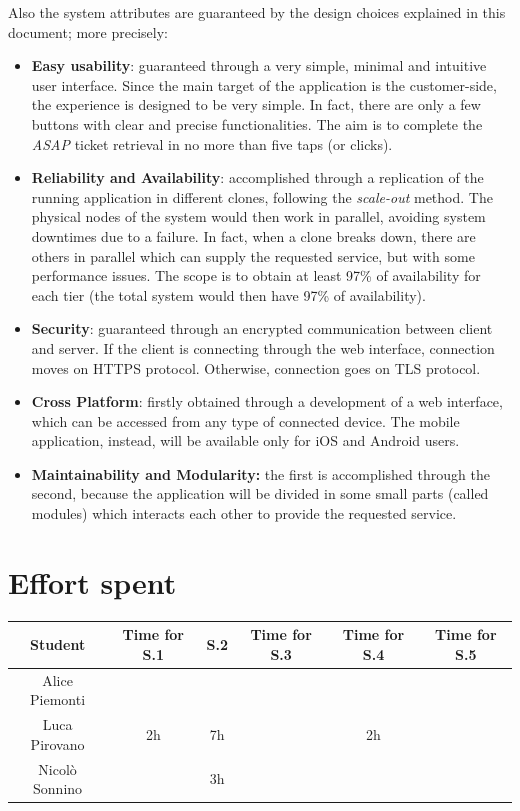 \documentclass[table, 12pt]{article}
\begin{document}
Also the system attributes are guaranteed by the design choices explained in this document; more precisely:
\begin{itemize}
    \item \textbf{Easy usability}: guaranteed through a very simple, minimal and intuitive user interface. Since the main target of the application is the customer-side, the experience is designed to be very simple. In fact, there are only a few buttons with clear and precise functionalities. The aim is to complete the \textit{ASAP} ticket retrieval in no more than five taps (or clicks).
    \item \textbf{Reliability and Availability}: accomplished through a replication of the running application in different clones, following the \textit{scale-out} method. The physical nodes of the system would then work in parallel, avoiding system downtimes due to a failure. In fact, when a clone breaks down, there are others in parallel which can supply the requested service, but with some performance issues. The scope is to obtain at least 97\% of availability for each tier (the total system would then have 97\% of availability).
    \item \textbf{Security}: guaranteed through an encrypted communication between client and server. If the client is connecting through the web interface, connection moves on HTTPS protocol. Otherwise, connection goes on TLS protocol.
    \item \textbf{Cross Platform}: firstly obtained through a development of a web interface, which can be accessed from any type of connected device. The mobile application, instead, will be available only for iOS and Android users.
    \item \textbf{Maintainability and Modularity:} the first is accomplished through the second, because the application will be divided in some small parts (called modules) which interacts each other to provide the requested service.
\end{itemize}

\pagestyle{plain}

\section{Effort spent}
\begin{tabular}{ | c || c | c | c | c| c|}
    \hline
    Student        & Time for S.1 & S.2 & Time for S.3 & Time for S.4 & Time for S.5 \\ \hline
    Alice Piemonti &              &     &              &              &              \\ \hline
    Luca Pirovano  & 2h           & 7h  &              & 2h           &              \\ \hline
    Nicolò Sonnino &              & 3h  &              &              &              \\
    \hline
\end{tabular}
\end{document}
